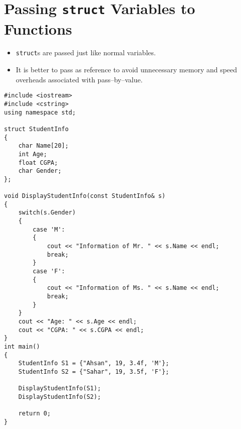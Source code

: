 \documentclass[12pt,a4paper]{article}
\begin{document}
\section{Passing \texttt{struct} Variables to Functions}
\begin{itemize}
\item \texttt{struct}s are passed just like normal variables.
\item It is better to pass as reference to avoid unnecessary memory and speed overheads associated with pass--by--value.
\end{itemize}
\begin{lstlisting}[caption={\texttt{struct} Initialisation}]
#include <iostream>
#include <cstring>
using namespace std;

struct StudentInfo
{
	char Name[20];
	int Age;
	float CGPA;
	char Gender;
};

void DisplayStudentInfo(const StudentInfo& s)
{
	switch(s.Gender)
	{
		case 'M':
		{
			cout << "Information of Mr. " << s.Name << endl;
			break;
		}
		case 'F':
		{
			cout << "Information of Ms. " << s.Name << endl;
			break;
		}
	}
	cout << "Age: " << s.Age << endl;
	cout << "CGPA: " << s.CGPA << endl;
}
int main()
{
	StudentInfo S1 = {"Ahsan", 19, 3.4f, 'M'};
	StudentInfo S2 = {"Sahar", 19, 3.5f, 'F'};

	DisplayStudentInfo(S1);
	DisplayStudentInfo(S2);

	return 0;
}
\end{lstlisting}
\end{document}
